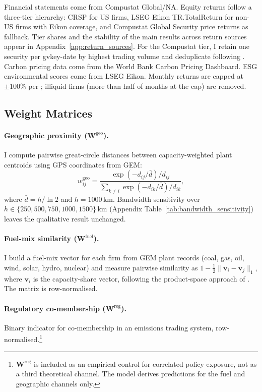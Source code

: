 \documentclass[12pt,a4paper]{article}
\newcommand{\bW}{\mathbf{W}}
\begin{document}
Financial statements come from Compustat Global/NA. Equity returns follow a three-tier hierarchy: CRSP for US firms, LSEG Eikon TR.TotalReturn for non-US firms with Eikon coverage, and Compustat Global Security price returns as fallback. Tier shares and the stability of the main results across return sources appear in Appendix~\ref{app:return_sources}. For the Compustat tier, I retain one security per gvkey-date by highest trading volume and deduplicate following \citet{IncePorter2006}. Carbon pricing data come from the World Bank Carbon Pricing Dashboard. ESG environmental scores come from LSEG Eikon. Monthly returns are capped at $\pm 100\%$ per \citet{IncePorter2006}; illiquid firms (more than half of months at the cap) are removed.

\subsection{Weight Matrices}\label{sec:weights}

\paragraph{Geographic proximity ($\bW^{\mathrm{geo}}$).} I compute pairwise great-circle distances between capacity-weighted plant centroids using GPS coordinates from GEM:
\[
  w^{\text{geo}}_{ij} = \frac{\exp(-d_{ij}/\bar{d})/d_{ij}}{\sum_{k\neq i}\exp(-d_{ik}/\bar{d})/d_{ik}},
\]
where $\bar{d} = h/\ln 2$ and $h = 1000$\,km. Bandwidth sensitivity over $h \in \{250, 500, 750, 1000, 1500\}$\,km (Appendix Table~\ref{tab:bandwidth_sensitivity}) leaves the qualitative result unchanged.

\paragraph{Fuel-mix similarity ($\bW^{\mathrm{fuel}}$).} I build a fuel-mix vector for each firm from GEM plant records (coal, gas, oil, wind, solar, hydro, nuclear) and measure pairwise similarity as $1 - \tfrac{1}{2}\lVert \mathbf{v}_i - \mathbf{v}_j \rVert_1$, where $\mathbf{v}_i$ is the capacity-share vector, following the product-space approach of \citet{HobergPhillips2016}. The matrix is row-normalised.

\paragraph{Regulatory co-membership ($\bW^{\mathrm{reg}}$).} Binary indicator for co-membership in an emissions trading system, row-normalised.\footnote{$\bW^{\mathrm{reg}}$ is included as an empirical control for correlated policy exposure, not as a third theoretical channel. The model derives predictions for the fuel and geographic channels only.}
\end{document}
